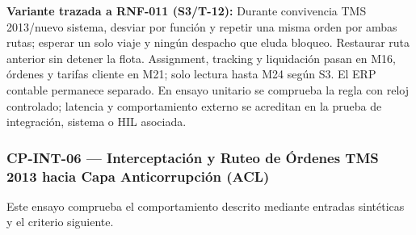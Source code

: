 \par\noindent\textbf{Variante trazada a RNF-011 (S3/T-12):} Durante convivencia TMS 2013/nuevo sistema, desviar por función y repetir una misma orden por ambas rutas; esperar un solo viaje y ningún despacho que eluda bloqueo. Restaurar ruta anterior sin detener la flota. Assignment, tracking y liquidación pasan en M16, órdenes y tarifas cliente en M21; solo lectura hasta M24 según S3. El ERP contable permanece separado. En ensayo unitario se comprueba la regla con reloj controlado; latencia y comportamiento externo se acreditan en la prueba de integración, sistema o HIL asociada.\par
\subsubsection*{CP-INT-06 — Interceptación y Ruteo de Órdenes TMS 2013 hacia Capa Anticorrupción (ACL)}\label{sec:9-cp-int-06}
Este ensayo comprueba el comportamiento descrito mediante entradas sintéticas y el criterio siguiente.

